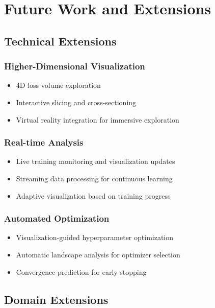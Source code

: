 \documentclass[12pt,a4paper]{article}
\begin{document}
\section{Future Work and Extensions}
\label{app:future-work}

\subsection{Technical Extensions}

\subsubsection{Higher-Dimensional Visualization}

\begin{itemize}
    \item 4D loss volume exploration
    \item Interactive slicing and cross-sectioning
    \item Virtual reality integration for immersive exploration
\end{itemize}

\subsubsection{Real-time Analysis}

\begin{itemize}
    \item Live training monitoring and visualization updates
    \item Streaming data processing for continuous learning
    \item Adaptive visualization based on training progress
\end{itemize}

\subsubsection{Automated Optimization}

\begin{itemize}
    \item Visualization-guided hyperparameter optimization
    \item Automatic landscape analysis for optimizer selection
    \item Convergence prediction for early stopping
\end{itemize}

\subsection{Domain Extensions}
\end{document}
